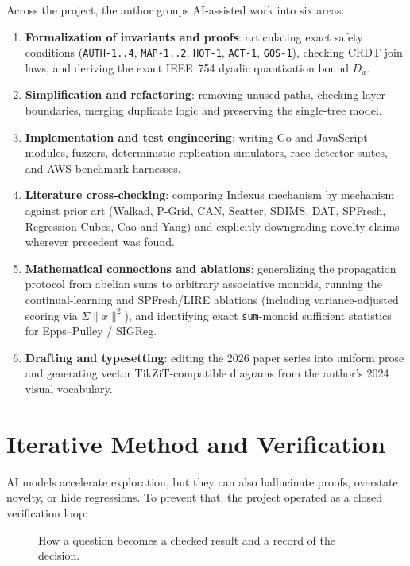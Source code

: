 \documentclass[11pt]{article}
\begin{document}
Across the project, the author groups AI-assisted work into six areas:
\begin{enumerate}[leftmargin=1.5em,itemsep=1pt]
  \item \textbf{Formalization of invariants and proofs}: articulating exact safety conditions (\texttt{AUTH-1..4}, \texttt{MAP-1..2}, \texttt{HOT-1}, \texttt{ACT-1}, \texttt{GOS-1}), checking CRDT join laws, and deriving the exact IEEE~754 dyadic quantization bound $D_a$.
  \item \textbf{Simplification and refactoring}: removing unused paths, checking layer boundaries, merging duplicate logic and preserving the single-tree model.
  \item \textbf{Implementation and test engineering}: writing Go and JavaScript modules, fuzzers, deterministic replication simulators, race-detector suites, and AWS benchmark harnesses.
  \item \textbf{Literature cross-checking}: comparing Indexus mechanism by mechanism against prior art (Walkad, P-Grid, CAN, Scatter, SDIMS, DAT, SPFresh, Regression Cubes, Cao and Yang) and explicitly downgrading novelty claims wherever precedent was found.
  \item \textbf{Mathematical connections and ablations}: generalizing the propagation protocol from abelian sums to arbitrary associative monoids, running the continual-learning and SPFresh/LIRE ablations (including variance-adjusted scoring via $\Sigma\|x\|^2$), and identifying exact \texttt{sum}-monoid sufficient statistics for Epps--Pulley / SIGReg.
  \item \textbf{Drafting and typesetting}: editing the 2026 paper series into uniform prose and generating vector TikZiT-compatible diagrams from the author's 2024 visual vocabulary.
\end{enumerate}

\section{Iterative Method and Verification}\hypertarget{ix:verification}{}
AI models accelerate exploration, but they can also hallucinate proofs, overstate novelty, or hide regressions. To prevent that, the project operated as a closed verification loop:

\begin{figure}[H]
    \centering
    \caption{How a question becomes a checked result and a record of the decision.}
\end{figure}
\end{document}
